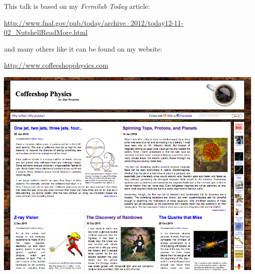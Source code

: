 \documentclass[compress]{beamer}
\begin{document}
\begin{frame}
\vspace{0.3 cm}
This talk is based on my {\it Fermilab Today} article:

\textcolor{blue}{\scriptsize \mbox{\url{http://www.fnal.gov/pub/today/archive_2012/today12-11-02_NutshellReadMore.html}}}

and many others like it can be found on my website:

\textcolor{blue}{\scriptsize \url{http://www.coffeeshopphysics.com}}

\begin{center}
\includegraphics[width=0.75\linewidth]{coffeeshopphysics.png}
\end{center}
\end{frame}
\end{document}
